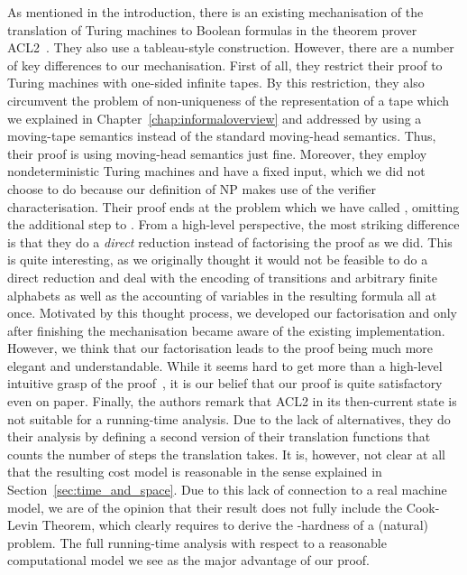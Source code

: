 As mentioned in the introduction, there is an existing mechanisation of the translation of Turing machines to Boolean formulas in the theorem prover ACL2~\cite{gamboa:cook}. They also use a tableau-style construction. However, there are a number of key differences to our mechanisation.
First of all, they restrict their proof to Turing machines with one-sided infinite tapes. By this restriction, they also circumvent the problem of non-uniqueness of the representation of a tape which we explained in Chapter~\ref{chap:informaloverview} and addressed by using a moving-tape semantics instead of the standard moving-head semantics. Thus, their proof is using moving-head semantics just fine.
Moreover, they employ nondeterministic Turing machines and have a fixed input, which we did not choose to do because our definition of NP makes use of the verifier characterisation. Their proof ends at the problem which we have called \fsat{}, omitting the additional step to \sat{}.
From a high-level perspective, the most striking difference is that they do a \textit{direct} reduction instead of factorising the proof as we did. This is quite interesting, as we originally thought it would not be feasible to do a direct reduction and deal with the encoding of transitions and arbitrary finite alphabets as well as the accounting of variables in the resulting formula all at once. Motivated by this thought process, we developed our factorisation and only after finishing the mechanisation became aware of the existing implementation.
However, we think that our factorisation leads to the proof being much more elegant and understandable. While it seems hard to get more than a high-level intuitive grasp of the proof~\cite{gamboa:cook}, it is our belief that our proof is quite satisfactory even on paper.
Finally, the authors remark that ACL2 in its then-current state is not suitable for a running-time analysis. Due to the lack of alternatives, they do their analysis by defining a second version of their translation functions that counts the number of steps the translation takes. It is, however, not clear at all that the resulting cost model is reasonable in the sense explained in Section~\ref{sec:time_and_space}.
Due to this lack of connection to a real machine model, we are of the opinion that their result does not fully include the Cook-Levin Theorem, which clearly requires to derive the \NP{}-hardness of a (natural) problem.
The full running-time analysis with respect to a reasonable computational model we see as the major advantage of our proof.

